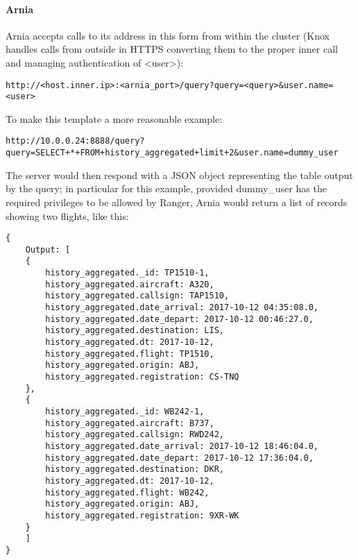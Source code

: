 \paragraph{Arnia}

Arnia accepts calls to its address in this form from within the cluster (Knox handles calls from outside in HTTPS converting them to the proper inner call and managing authentication of <user>): 

\begin{code}
	\begin{verbatim}
http://<host.inner.ip>:<arnia_port>/query?query=<query>&user.name=<user>
	\end{verbatim}
\end{code}

To make this template a more reasonable example:

\begin{code}
	\begin{verbatim}
http://10.0.0.24:8888/query?query=SELECT+*+FROM+history_aggregated+limit+2&user.name=dummy_user
	\end{verbatim}
\end{code}

\pagebreak
The server would then respond with a JSON object representing the table output by the query; in particular for this example, provided dummy\_user has the required privileges to be allowed by Ranger, Arnia would return a list of records showing two flights, like this:

\begin{code}
	\begin{verbatim}
{
    Output: [
    {
        history_aggregated._id: TP1510-1, 
        history_aggregated.aircraft: A320, 
        history_aggregated.callsign: TAP1510, 
        history_aggregated.date_arrival: 2017-10-12 04:35:08.0, 
        history_aggregated.date_depart: 2017-10-12 00:46:27.0, 
        history_aggregated.destination: LIS, 
        history_aggregated.dt: 2017-10-12, 
        history_aggregated.flight: TP1510, 
        history_aggregated.origin: ABJ, 
        history_aggregated.registration: CS-TNQ
    }, 
    {
        history_aggregated._id: WB242-1, 
        history_aggregated.aircraft: B737, 
        history_aggregated.callsign: RWD242, 
        history_aggregated.date_arrival: 2017-10-12 18:46:04.0, 
        history_aggregated.date_depart: 2017-10-12 17:36:04.0, 
        history_aggregated.destination: DKR, 
        history_aggregated.dt: 2017-10-12, 
        history_aggregated.flight: WB242, 
        history_aggregated.origin: ABJ, 
        history_aggregated.registration: 9XR-WK
    }
    ]
}
	\end{verbatim}
\end{code}

